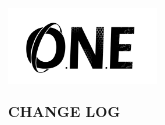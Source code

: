 	
	\pagestyle{changelog}   %
	\hfill\includegraphics[height=2cm]{media/logooneblack}
	\begin{center}
		\textbf{\Large CHANGE LOG}
		\vspace{1cm}
		
		\ONEedits
	\end{center}
	
	
	\tableofcontents
	\clearpage
	
	\pagestyle{plain}